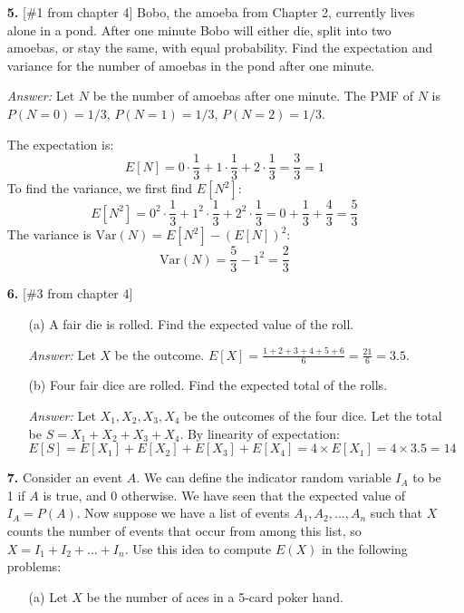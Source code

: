 \documentclass{article}
\begin{document}
\begin{enumerate}
    \setcounter{enumi}{4} %
    \item[\textbf{5.}] [\#1 from chapter 4] Bobo, the amoeba from Chapter 2, currently lives alone in a pond. After one minute Bobo will either die, split into two amoebas, or stay the same, with equal probability. Find the expectation and variance for the number of amoebas in the pond after one minute.

    \medskip
    \noindent \textit{Answer:}
    Let $N$ be the number of amoebas after one minute. The PMF of $N$ is $P(N=0)=1/3$, $P(N=1)=1/3$, $P(N=2)=1/3$.
    
    The expectation is:
    \[
        E[N] = 0 \cdot \frac{1}{3} + 1 \cdot \frac{1}{3} + 2 \cdot \frac{1}{3} = \frac{3}{3} = 1
    \]
    To find the variance, we first find $E[N^2]$:
    \[
        E[N^2] = 0^2 \cdot \frac{1}{3} + 1^2 \cdot \frac{1}{3} + 2^2 \cdot \frac{1}{3} = 0 + \frac{1}{3} + \frac{4}{3} = \frac{5}{3}
    \]
    The variance is $\text{Var}(N) = E[N^2] - (E[N])^2$:
    \[
        \text{Var}(N) = \frac{5}{3} - 1^2 = \frac{2}{3}
    \]

    \item[\textbf{6.}] [\#3 from chapter 4]
    \begin{enumerate}
        \item[(a)] A fair die is rolled. Find the expected value of the roll.
        
        \medskip
        \noindent \textit{Answer:}
        Let $X$ be the outcome. $E[X] = \frac{1+2+3+4+5+6}{6} = \frac{21}{6} = 3.5$.
        
        \item[(b)] Four fair dice are rolled. Find the expected total of the rolls.
        
        \medskip
        \noindent \textit{Answer:}
        Let $X_1, X_2, X_3, X_4$ be the outcomes of the four dice. Let the total be $S = X_1+X_2+X_3+X_4$. By linearity of expectation:
        \[
            E[S] = E[X_1] + E[X_2] + E[X_3] + E[X_4] = 4 \times E[X_1] = 4 \times 3.5 = 14
        \]
    \end{enumerate}

    \item[\textbf{7.}] Consider an event $A$. We can define the indicator random variable $I_{A}$ to be 1 if $A$ is true, and 0 otherwise. We have seen that the expected value of $I_{A}=P(A)$. Now suppose we have a list of events $A_{1},A_{2},...,A_{n}$ such that $X$ counts the number of events that occur from among this list, so $X = I_{1}+I_{2}+...+I_{n}$. Use this idea to compute $E(X)$ in the following problems:
    \begin{enumerate}
        \item[(a)] Let $X$ be the number of aces in a 5-card poker hand.
        

\end{enumerate}
\end{enumerate}
\end{document}
